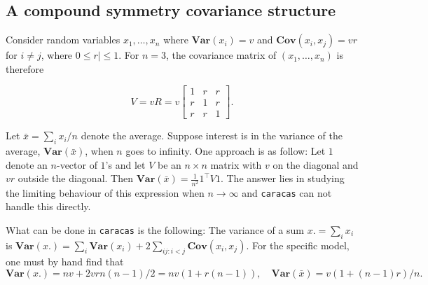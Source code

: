 \documentclass[10pt,]{article}
\newenvironment{Shaded}{\begin{snugshade}}{\end{snugshade}}
\newcommand{\DecValTok}[1]{\textcolor[rgb]{0.00,0.00,0.81}{#1}}
\newcommand{\KeywordTok}[1]{\textcolor[rgb]{0.13,0.29,0.53}{\textbf{#1}}}
\newcommand{\NormalTok}[1]{#1}
\newcommand{\OperatorTok}[1]{\textcolor[rgb]{0.81,0.36,0.00}{\textbf{#1}}}
\newcommand{\StringTok}[1]{\textcolor[rgb]{0.31,0.60,0.02}{#1}}
\begin{document}
\hypertarget{sec:cov_fun}{%
\subsection{A compound symmetry covariance
structure}\label{sec:cov_fun}}

Consider random variables \(x_1,\dots, x_n\) where
\(\mathbf{Var}(x_i)=v\) and \(\mathbf{Cov}(x_i, x_j)=v r\) for
\(i\not = j\), where \(0 \le r| \le1\). For \(n=3\), the covariance
matrix of \((x_1,\dots, x_n)\) is therefore

\begin{equation}
  \label{eq:1}
  V= v R = v \left[\begin{matrix}1 & r & r\\r & 1 & r\\r & r & 1\end{matrix}\right]. 
\end{equation}

Let \(\bar x = \sum_i x_i / n\) denote the average. Suppose interest is
in the variance of the average, \(\mathbf{Var}(\bar x)\), when \(n\)
goes to infinity. One approach is as follow: Let \(1\) denote an
\(n\)-vector of \(1\)'s and let \(V\) be an \(n \times n\) matrix with
\(v\) on the diagonal and \(v r\) outside the diagonal. Then
\(\mathbf{Var}(\bar x)=\frac 1 {n^2} 1^\top V 1\). The answer lies in
studying the limiting behaviour of this expression when
\(n\rightarrow \infty\) and \texttt{caracas} can not handle this
directly.

What can be done in \texttt{caracas} is the following: The variance of a
sum \(x. = \sum_i x_i\) is
\(\mathbf{Var}(x.) = \sum_i \mathbf{Var}(x_i) + 2 \sum_{ij:i<j} \mathbf{Cov}(x_i, x_j)\).
For the specific model, one must by hand find that \[
\mathbf{Var}(x.) = n v + 2 v r n (n-1) / 2 = n v (1 + r (n-1)),
\quad
  \mathbf{Var}(\bar x) = v (1 + (n-1)r)/n.
\]

\begin{Shaded}
\end{Shaded}
\end{document}
